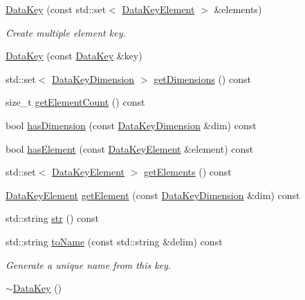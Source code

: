 \begin{DoxyCompactItemize}
\hyperlink{classBUSBOY_1_1DataKey_a7400abad73819b03383e319bf5a8d792}{DataKey} (const std::set$<$ \hyperlink{classBUSBOY_1_1DataKeyElement}{DataKeyElement} $>$ \&elements)
\begin{DoxyCompactList}\small\item\em Create multiple element key. \item\end{DoxyCompactList}\item 
\hyperlink{classBUSBOY_1_1DataKey_a1a3fa06e41b8139e9f2e4e4a42710e36}{DataKey} (const \hyperlink{classBUSBOY_1_1DataKey}{DataKey} \&key)
\item 
std::set$<$ \hyperlink{classBUSBOY_1_1DataKeyDimension}{DataKeyDimension} $>$ \hyperlink{classBUSBOY_1_1DataKey_a7a2e1751943d5cdaf77dadda9fe73dc9}{getDimensions} () const 
\item 
size\_\-t \hyperlink{classBUSBOY_1_1DataKey_a6f07dc15b1bc3bca93f0178c38ba7556}{getElementCount} () const 
\item 
bool \hyperlink{classBUSBOY_1_1DataKey_a8fcf134470530a671a2cb7d672bc9aed}{hasDimension} (const \hyperlink{classBUSBOY_1_1DataKeyDimension}{DataKeyDimension} \&dim) const 
\item 
bool \hyperlink{classBUSBOY_1_1DataKey_a6852012b6e5829d7c57c3ed95635168f}{hasElement} (const \hyperlink{classBUSBOY_1_1DataKeyElement}{DataKeyElement} \&element) const 
\item 
std::set$<$ \hyperlink{classBUSBOY_1_1DataKeyElement}{DataKeyElement} $>$ \hyperlink{classBUSBOY_1_1DataKey_a6d0ecaa668b9f8163f0f52216db10a3a}{getElements} () const 
\item 
\hyperlink{classBUSBOY_1_1DataKeyElement}{DataKeyElement} \hyperlink{classBUSBOY_1_1DataKey_a02a769f2f6549998b94e521127975e0a}{getElement} (const \hyperlink{classBUSBOY_1_1DataKeyDimension}{DataKeyDimension} \&dim) const 
\item 
std::string \hyperlink{classBUSBOY_1_1DataKey_a52c707f89b0874730eb4b9fad1692e8d}{str} () const 
\item 
std::string \hyperlink{classBUSBOY_1_1DataKey_aa48ef3beade55dbf91414cea8f5dbdf3}{toName} (const std::string \&delim) const 
\begin{DoxyCompactList}\small\item\em Generate a unique name from this key. \item\end{DoxyCompactList}\item 
\hyperlink{classBUSBOY_1_1DataKey_a0406cc6a3f60b7d056e5315c84cebbd7}{$\sim$DataKey} ()

\end{DoxyCompactItemize}
